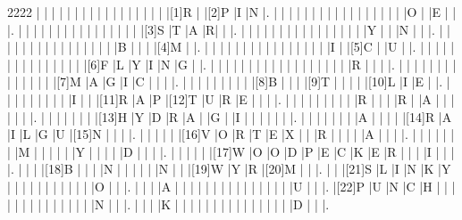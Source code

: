 \setlength{\PuzzleUnitlength}{21pt}
\begin{Puzzle}{22}{22}
|{} |{} |{} |{} |{} |{} |{} |{} |{} |{} |{} |{} |{} |{} |{} |{} |{} |[1]R |{} |[2]P |I |N |.
|{} |{} |{} |{} |{} |{} |{} |{} |{} |{} |{} |{} |{} |{} |{} |{} |{} |O |{} |E |{} |{} |.
|{} |{} |{} |{} |{} |{} |{} |{} |{} |{} |{} |{} |{} |{} |{} |{} |[3]S |T |A |R|{} |{} |.
|{} |{} |{} |{} |{} |{} |{} |{} |{} |{} |{} |{} |{} |{} |{} |{} |Y |{} |{} |N |{} |{} |.
|{} |{} |{} |{} |{} |{} |{} |{} |{} |{} |{} |{} |{} |{} |{} |{} |B |{} |{} |{} |[4]M |{} |.
|{} |{} |{} |{} |{} |{} |{} |{} |{} |{} |{} |{} |{} |{} |{} |{} |I |{} |[5]C |{} |U |{} |.
|{} |{} |{} |{} |{} |{} |{} |{} |{} |{} |{} |{} |{} |{} |{} |[6]F |L |Y |I |N |G |{} |.
|{} |{} |{} |{} |{} |{} |{} |{} |{} |{} |{} |{} |{} |{} |{} |{} |{} |{} |R |{} |{} |{} |.
|{} |{} |{} |{} |{} |{} |{} |{} |{} |{} |{} |{} |{} |{} |[7]M |A |G |I |C |{} |{} |{} |.
|{} |{} |{} |{} |{} |{} |{} |{} |{} |[8]B |{} |{} |{} |[9]T |{} |{} |{} |{} |[10]L |I |E |{} |.
|{} |{} |{} |{} |{} |{} |{} |{} |{} |I |{} |{} |[11]R |A |P |[12]T |U |R |E |{} |{} |{} |.
|{} |{} |{} |{} |{} |{} |{} |{} |{} |R |{} |{} |{} |R |{} |A |{} |{} |{} |{} |{} |{} |.
|{} |{} |{} |{} |{} |{} |{} |[13]H |Y |D |R |A |{} |G |{} |I |{} |{} |{} |{} |{} |{} |.
|{} |{} |{} |{} |{} |{} |{} |A |{} |{} |{} |{} |[14]R |A |I |L |G |U |[15]N |{} |{} |{} |.
|{} |{} |{} |{} |{} |[16]V |O |R |T |E |X |{} |{} |R |{} |{} |{} |{} |A |{} |{} |{} |.
|{} |{} |{} |{} |{} |{} |{} |M |{} |{} |{} |{} |{} |Y |{} |{} |{} |{} |D |{} |{} |{} |.
|{} |{} |{} |{} |{} |[17]W |O |O |D |P |E |C |K |E |R |{} |{} |{} |I |{} |{} |{} |.
|{} |{} |{} |[18]B |{} |{} |{} |N |{} |{} |{} |{} |{} |N |{} |{} |[19]W |Y |R |[20]M |{} |{} |.
|{} |{} |[21]S |L |I |N |K |Y |{} |{} |{} |{} |{} |{} |{} |{} |{} |{} |{} |O |{} |{} |.
|{} |{} |{} |A |{} |{} |{} |{} |{} |{} |{} |{} |{} |{} |{} |{} |{} |{} |{} |U |{} |{} |.
|[22]P |U |N |C |H |{} |{} |{} |{} |{} |{} |{} |{} |{} |{} |{} |{} |{} |{} |N |{} |{} |.
|{} |{} |{} |K |{} |{} |{} |{} |{} |{} |{} |{} |{} |{} |{} |{} |{} |{} |{} |D |{} |{} |.
\end{Puzzle}

